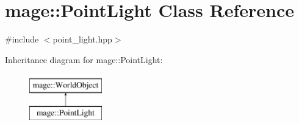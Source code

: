 \hypertarget{classmage_1_1_point_light}{}\section{mage\+:\+:Point\+Light Class Reference}
\label{classmage_1_1_point_light}


{\ttfamily \#include $<$point\+\_\+light.\+hpp$>$}

Inheritance diagram for mage\+:\+:Point\+Light\+:\begin{figure}[H]
\begin{center}
\leavevmode
\includegraphics[height=2.000000cm]{classmage_1_1_point_light}
\end{center}
\end{figure}
